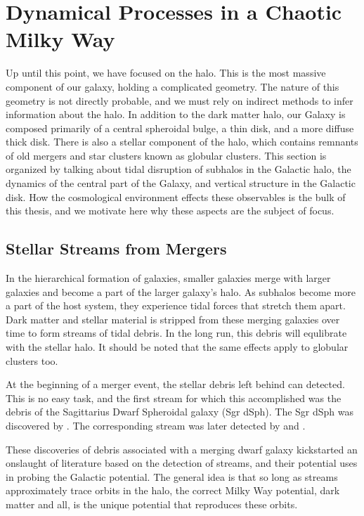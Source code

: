 \section{Dynamical Processes in a Chaotic Milky Way}

Up until this point, we have focused on the halo. This is the most massive component of our galaxy, holding a complicated geometry. The nature of this geometry is not directly probable, and we must rely on indirect methods to infer information about the halo. In addition to the dark matter halo, our Galaxy is composed primarily of a central spheroidal bulge, a thin disk, and a more diffuse thick disk. There is also a stellar component of the halo, which contains remnants of old mergers and star clusters known as globular clusters. This section is organized by talking about tidal disruption of subhalos in the Galactic halo, the dynamics of the central part of the Galaxy, and vertical structure in the Galactic disk. How the cosmological environment effects these observables is the bulk of this thesis, and we motivate here why these aspects are the subject of focus.

\subsection{Stellar Streams from Mergers}

In the hierarchical formation of galaxies, smaller galaxies merge with larger galaxies and become a part of the larger galaxy's halo. As subhalos become more a part of the host system, they experience tidal forces that stretch them apart. Dark matter and stellar material is stripped from these merging galaxies over time to form streams of tidal debris. In the long run, this debris will equlibrate with the stellar halo. It should be noted that the same effects apply to globular clusters too.

At the beginning of a merger event, the stellar debris left behind can detected. This is no easy task, and the first stream for which this accomplished was the debris of the Sagittarius Dwarf Spheroidal galaxy (Sgr dSph). The Sgr dSph was discovered by \citet{ibata_discovery}. The corresponding stream was later detected by \citet{newberg_2002} and \citet{majewski_2003}. 

These discoveries of debris associated with a merging dwarf galaxy kickstarted an onslaught of literature based on the detection of streams, and their potential uses in probing the Galactic potential. The general idea is that so long as streams approximately trace orbits in the halo, the correct Milky Way potential, dark matter and all, is the unique potential that reproduces these orbits. 

